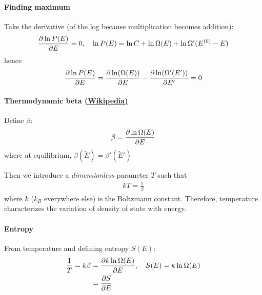 \documentclass[../main.tex]{subfiles}
\begin{document}
\paragraph*{Finding maximum} Take the derivative (of the log because multiplication becomes addition):
\begin{align*}
    \pdv{\ln P(E)}{E} = 0, \quad \ln P(E) = \ln C + \ln \Omega(E) + \ln \Omega'(E^{(0)} - E)
\end{align*}
hence
\begin{align*}
    \pdv{\ln P(E)}{E} = \pdv{\ln(\Omega(E))}{E} - \pdv{\ln(\Omega'(E'))}{E'} = 0
\end{align*}

\paragraph*{Thermodynamic beta \href{https://en.wikipedia.org/wiki/Thermodynamic_beta}{(Wikipedia)}}
Define $\beta$:
\begin{align*}
    \beta = \pdv{\ln \Omega(E)}{E}
\end{align*}
where at equilibrium, \(\beta(\tilde E) = \beta'(\tilde E')\)

Then we introduce a \textit{dimensionless} parameter $T$ such that
\begin{align*}
    \boxed{k T = \frac{1}{\beta}}
\end{align*}
where $k$ ($k_B$ everywhere else) is the Boltzmann constant. Therefore, temperature characterizes the variation of density of state with energy.

\paragraph*{Entropy} From temperature and defining entropy $S(E)$:
\begin{align*}
    \frac{1}{T} = k\beta &= \pdv{k \ln \Omega(E)}{E}, \quad S(E) = k \ln\Omega (E) \\
    &= \pdv{S}{E}
\end{align*}
\end{document}
